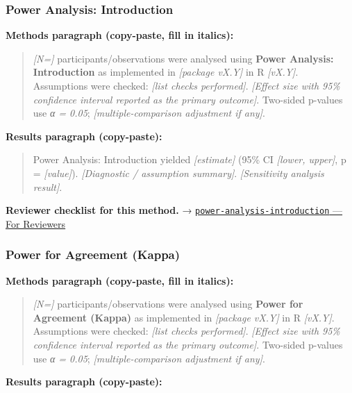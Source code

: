 \documentclass[
]{article}
\begin{document}
\subsubsection{Power Analysis:
Introduction}\label{power-analysis-introduction}

\textbf{Methods paragraph (copy-paste, fill in italics):}

\begin{quote}
\emph{{[}N={]}} participants/observations were analysed using
\textbf{Power Analysis: Introduction} as implemented in \emph{{[}package
vX.Y{]}} in R \emph{{[}vX.Y{]}}. Assumptions were checked: \emph{{[}list
checks performed{]}}. \emph{{[}Effect size with 95\% confidence interval
reported as the primary outcome{]}}. Two-sided p-values use \emph{α =
0.05}; \emph{{[}multiple-comparison adjustment if any{]}}.
\end{quote}

\textbf{Results paragraph (copy-paste):}

\begin{quote}
Power Analysis: Introduction yielded \emph{{[}estimate{]}} (95\% CI
\emph{{[}lower, upper{]}}, p = \emph{{[}value{]}}). \emph{{[}Diagnostic
/ assumption summary{]}}. \emph{{[}Sensitivity analysis result{]}}.
\end{quote}

\textbf{Reviewer checklist for this method.} →
\href{../chapters/05-power/power-analysis-introduction.Rmd\#for-reviewers}{\texttt{power-analysis-introduction}
--- For Reviewers}

\subsubsection{Power for Agreement
(Kappa)}\label{power-for-agreement-kappa}

\textbf{Methods paragraph (copy-paste, fill in italics):}

\begin{quote}
\emph{{[}N={]}} participants/observations were analysed using
\textbf{Power for Agreement (Kappa)} as implemented in \emph{{[}package
vX.Y{]}} in R \emph{{[}vX.Y{]}}. Assumptions were checked: \emph{{[}list
checks performed{]}}. \emph{{[}Effect size with 95\% confidence interval
reported as the primary outcome{]}}. Two-sided p-values use \emph{α =
0.05}; \emph{{[}multiple-comparison adjustment if any{]}}.
\end{quote}

\textbf{Results paragraph (copy-paste):}
\end{document}
